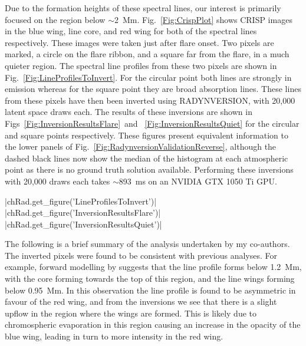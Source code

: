 Due to the formation heights of these spectral lines, our interest is primarily focused on the region below $\sim$\SI{2}{\mega\metre}.
Fig.~\ref{Fig:CrispPlot} shows CRISP images in the blue wing, line core, and red wing for both of the spectral lines respectively.
These images were taken just after flare onset.
Two pixels are marked, a circle on the flare ribbon, and a square far from the flare, in a much quieter region.
The spectral line profiles from these two pixels are shown in Fig.~\ref{Fig:LineProfilesToInvert}.
For the circular point both lines are strongly in emission whereas for the square point they are broad absorption lines.
These lines from these pixels have then been inverted using RADYNVERSION, with 20,000 latent space draws each.
The results of these inversions are shown in Figs~\ref{Fig:InversionResultsFlare}~and~
\ref{Fig:InversionResultsQuiet} for the circular and square points respectively.
These figures present equivalent information to the lower panels of Fig.~\ref{Fig:RadynversionValidationReverse}, although the dashed black lines now show the median of the histogram at each atmospheric point as there is no ground truth solution available.
Performing these inversions with 20,000 draws each takes $\sim$\SI{893}{\milli\second} on an NVIDIA GTX 1050 Ti GPU.

\py[Radynversion]|chRad.get_figure('LineProfilesToInvert')|
\py[Radynversion]|chRad.get_figure('InversionResultsFlare')|
\py[Radynversion]|chRad.get_figure('InversionResultsQuiet')|

The following is a brief summary of the analysis undertaken by my co-authors.
The inverted pixels were found to be consistent with previous analyses.
For example, forward modelling by \citet{Kuridze2015} suggests that the \Ha{} line profile forms below \SI{1.2}{\mega\metre}, with the core forming towards the top of this region, and the line wings forming below \SI{0.95}{\mega\metre}.
In this observation the \Ha{} line profile is found to be asymmetric in favour of the red wing, and from the inversions we see that there is a slight upflow in the region where the wings are formed.
This is likely due to chromospheric evaporation in this region causing an increase in the opacity of the blue wing, leading in turn to more intensity in the red wing.


